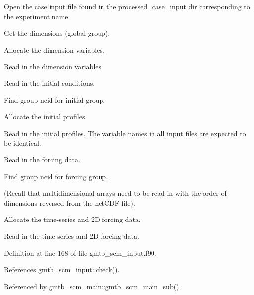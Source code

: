 \begin{DoxyItemize}
\item Open the case input file found in the processed\+\_\+case\+\_\+input dir corresponding to the experiment name.
\item Get the dimensions (global group).
\item Allocate the dimension variables.
\item Read in the dimension variables.
\item Read in the initial conditions.
\begin{DoxyItemize}
\item Find group ncid for initial group.
\item Allocate the initial profiles.
\item Read in the initial profiles. The variable names in all input files are expected to be identical.
\end{DoxyItemize}
\item Read in the forcing data.
\begin{DoxyItemize}
\item Find group ncid for forcing group.
\item (Recall that multidimensional arrays need to be read in with the order of dimensions reversed from the net\+C\+DF file).
\item Allocate the time-\/series and 2D forcing data.
\item Read in the time-\/series and 2D forcing data.
\end{DoxyItemize}
\end{DoxyItemize}

Definition at line 168 of file gmtb\+\_\+scm\+\_\+input.\+f90.



References gmtb\+\_\+scm\+\_\+input\+::check().



Referenced by gmtb\+\_\+scm\+\_\+main\+::gmtb\+\_\+scm\+\_\+main\+\_\+sub().

